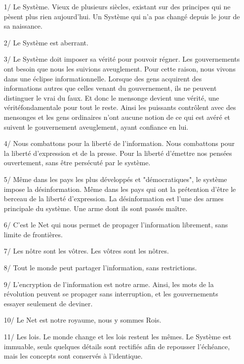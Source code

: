 \documentclass[11pt,twoside,a4paper]{book}
\begin{document}
\begin{enumerate}
\begin{enumerate}
		\item[1/] Le Syst{\`e}me. Vieux de plusieurs si{\`e}cles, existant sur des principes qui ne p{\`e}sent plus rien aujourd'hui. Un Syst{\`e}me qui n'a pas chang{\'e} depuis le jour de sa naissance.
		\item[2/] Le Syst{\`e}me est aberrant.
		\item[3/] Le Syst{\`e}me doit imposer sa v{\'e}rit{\'e} pour pouvoir r{\'e}gner. Les gouvernements ont besoin que nous les suivions aveuglement. Pour cette raison, nous vivons dans une {\'e}clipse informationnelle. Lorsque des gens acquirent des informations autres que celles venant du gouvernement, ils ne peuvent distinguer le vrai du faux. Et donc le mensonge devient une v{\'e}rit{\'e}, une v{\'e}rit{\'e}fondamentale pour tout le reste. Ainsi les puissants contr{\^o}lent avec des mensonges et les gens ordinaires n'ont aucune notion de ce qui est av{\'e}r{\'e} et suivent le gouvernement aveuglement, ayant confiance en lui.
		\item[4/] Nous combattons pour la libert{\'e} de l'information. Nous combattons pour la libert{\'e} d'expression et de la presse. Pour la libert{\'e} d'{\'e}mettre nos pens{\'e}es ouvertement, sans {\^e}tre pers{\'e}cut{\'e} par le syst{\`e}me.
		\item[5/] M{\^e}me dans les pays les plus d{\'e}velopp{\'e}s et "d{\'e}mocratiques", le syst{\`e}me impose la d{\'e}sinformation. M{\^e}me dans les pays qui ont la pr{\'e}tention d'{\^e}tre le berceau de la libert{\'e} d'expression. La d{\'e}sinformation est l'une des armes principale du syst{\`e}me. Une arme dont ils sont pass{\'e}s ma{\^i}tre.
		\item[6/] C'est le Net qui nous permet de propager l'information librement, sans limite de fronti{\`e}res.
		\item[7/] Les n{\^o}tre sont les v{\^o}tres. Les v{\^o}tres sont les n{\^o}tres.
		\item[8/] Tout le monde peut partager l'information, sans restrictions.
		\item[9/] L'encryption de l'information est notre arme. Ainsi, les mots de la r{\'e}volution peuvent se propager sans interruption, et les gouvernements essayer seulement de deviner.
		\item[10/] Le Net est notre royaume, nous y sommes Rois.
		\item[11/] Les lois. Le monde change et les lois restent les m{\^e}mes. Le Syst{\`e}me est immuable, seuls quelques d{\'e}tails sont rectifi{\'e}s afin de repousser l'{\'e}ch{\'e}ance, mais les concepts sont conserv{\'e}s {\`a} l'identique.

\end{enumerate}
\end{enumerate}
\end{document}
